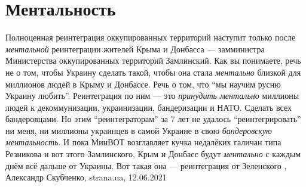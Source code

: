  
 
 
 
 
\chapter{Ментальность}

Полноценная реинтеграция оккупированных территорий наступит только после
\emph{ментальной} реинтеграции жителей Крыма и Донбасса — замминистра Министерства
оккупированных территорий Замлинский. Как вы понимаете, речь не о том, чтобы
Украину сделать такой, чтобы она стала \emph{ментально} близкой для миллионов людей в
Крыму и Донбассе. Речь о том, что \enquote{мы научим русню Украину любить}.
Реинтеграция по ним — это \emph{принудить ментально} миллионы людей к декоммунизации,
украинизации, бандеризации и НАТО. Сделать всех бандеровцами.  Но этим
\enquote{реинтеграторам} за 7 лет не удалось \enquote{реинтегрировать} ни меня,
ни миллионы украинцев в самой Украине в свою \emph{бандеровскую ментальность}. И пока
МинВОТ возглавляет кучка недалёких галичан типа Резникова и вот этого
Замлинского, Крым и Донбасс будут \emph{ментально} с каждым днём всё дальше от
Украины. Вот такая она — реинтеграция от Зеленского
, 
Александр Скубченко, strana.ua, 12.06.2021


